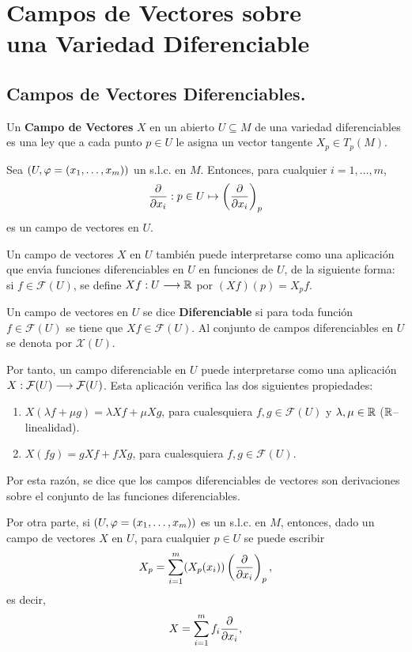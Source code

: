 \documentclass[cursovd_portada.tex]{subfiles}
\begin{document}
\chapter{Campos de Vectores sobre\\ una Variedad Diferenciable}
\section{Campos de Vectores Diferenciables.}
\begin{defi}
Un {\bf Campo de Vectores} $X$ en un abierto $U\subseteq M$ de una variedad diferenciables es una ley que a cada
punto $p\in U$ le asigna un vector tangente $X_p\in T_p(M)$.
\end{defi}
\begin{ej}
{\rm Sea $(U,\varphi=(x_1,\dots ,x_m))$ un s.l.c. en $M$. Entonces, para cualquier $i=1,\dots ,m$,
$$\displaystyle{\frac{\partial}{\partial x_i}}:p\in U\mapsto\left(\displaystyle{\frac{\partial}{\partial x_i}}\right)_p$$
es un campo de vectores en $U$.}
\end{ej}
Un campo de vectores $X$ en $U$ tambi\'{e}n puede interpretarse como una aplicaci\'{o}n que env\'{\i}a funciones diferenciables
en $U$ en funciones de $U$, de la siguiente forma: si $f\in\mathcal{F}(U)$, se define $Xf:U\longrightarrow\mathbb{R}$ por
$(Xf)(p)=X_pf$.
\begin{defi}
Un campo de vectores en $U$ se dice {\bf Diferenciable} si para toda funci\'{o}n $f\in\mathcal{F}(U)$ se tiene que
$Xf\in\mathcal{F}(U)$. Al conjunto de campos diferenciables en $U$ se denota por $\mathcal{X}(U)$.
\end{defi}
Por tanto, un campo diferenciable en $U$ puede interpretarse como una aplicaci\'{o}n
$X:\mathcal{F}(U)\longrightarrow\mathcal{F}(U)$. Esta aplicaci\'{o}n verifica las dos siguientes propiedades:
\begin{enumerate}
\item $X(\lambda f+\mu g)=\lambda Xf+\mu Xg$, para cualesquiera $f,g\in\mathcal{F}(U)$ y $\lambda,\mu\in\mathbb{R}$
($\mathbb{R}$--linealidad).
\item $X(fg)=gXf+fXg$, para cualesquiera $f,g\in\mathcal{F}(U)$.
\end{enumerate}
\hs Por esta raz\'{o}n, se dice que los campos diferenciables de vectores son derivaciones sobre el conjunto de las
funciones diferenciables.
\par
Por otra parte, si $(U,\varphi=(x_1,\dots ,x_m))$ es un s.l.c. en $M$, entonces, dado un campo de vectores $X$ en $U$,
para cualquier $p\in U$ se puede escribir
$$X_p=\sum_{i=1}^m(X_p(x_i))\left(\displaystyle{\frac{\partial}{\partial x_i}}\right)_p,$$
es decir,
$$X=\sum_{i=1}^mf_i\displaystyle{\frac{\partial}{\partial x_i}},$$
\end{document}
